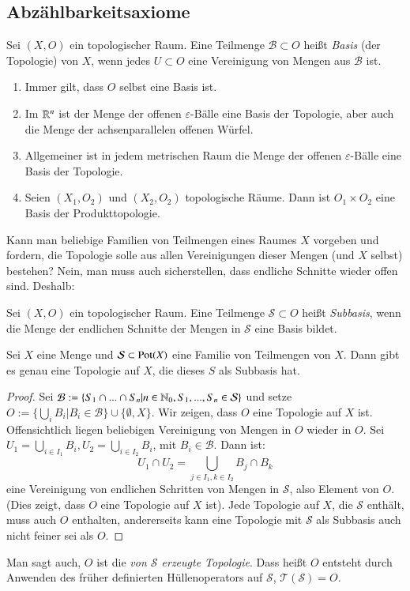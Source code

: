 \documentclass[a4paper,10pt]{scrartcl}
\newcommand{\eps}{\varepsilon}
\begin{document}
\subsection{Abzählbarkeitsaxiome}
\begin{df}
 Sei $(X,O)$ ein topologischer Raum. Eine Teilmenge $\mathcal B\subset O$ heißt \emph{Basis} (der Topologie) von $X$, wenn jedes $U\subset O$ eine Vereinigung von Mengen aus $\mathcal B$ ist.
\end{df}
\begin{exs*}
 \begin{enumerate}
  \item Immer gilt, dass $O$ selbst eine Basis ist.
  \item Im $\mathbb{R}^n$ ist der Menge der offenen $\eps$-Bälle eine Basis der Topologie, aber auch die Menge der achsenparallelen offenen Würfel.
  \item Allgemeiner ist in jedem metrischen Raum die Menge der offenen $\eps$-Bälle eine Basis der Topologie.
  \item Seien $(X_1,O_2)$ und $(X_2,O_2)$ topologische Räume. Dann ist $O_1\times O_2$ eine Basis der Produkttopologie.
\end{enumerate}
\end{exs*}
Kann man beliebige Familien von Teilmengen eines Raumes $X$ vorgeben und fordern, die Topologie solle aus allen Vereinigungen dieser Mengen (und $X$ selbst) bestehen? Nein, man muss auch sicherstellen, dass endliche Schnitte wieder offen sind. Deshalb:
\begin{df}
 Sei $(X,O)$ ein topologischer Raum. Eine Teilmenge $\mathcal S\subset O$ heißt \emph{Subbasis}, wenn die Menge der endlichen Schnitte der Mengen in $\mathcal S$ eine Basis bildet.
\end{df}
\begin{st}\label{thm:4.3}
 Sei $X$ eine Menge und $\mathcal S\subset \operatorname{Pot}(X)$  eine Familie von Teilmengen von $X$. Dann gibt es genau eine Topologie auf $X$, die dieses $S$ als Subbasis hat.
\end{st}
\begin{proof}
Sei $\mathcal B:=\{S_1\cap...\cap S_n|n\in \mathbb{N}_0, S_1,...,S_n\in \mathcal S\}$ und setze $O:=\{\bigcup_iB_i|B_i\in \mathcal B\} \cup\{\emptyset,X\}$.
 Wir zeigen, dass $O$ eine Topologie auf $X$ ist. Offensichtlich liegen beliebigen Vereinigung von Mengen in $O$ wieder in $O$. 
Sei $U_1=\bigcup_{i\in I_1}B_i, U_2=\bigcup_{i\in I_2}B_i$, mit $B_i\in \mathcal B$. Dann ist:
\[
 U_1\cap U_2=\bigcup\limits_{j\in I_1,k\in I_2}B_j\cap B_k
\]
eine Vereinigung von endlichen Schritten von Mengen in $\mathcal S$, also Element von $O$. (Dies zeigt, dass $O$ eine Topologie auf $X$ ist). 
Jede Topologie auf $X$, die $\mathcal S$ enthält, muss auch $O$ enthalten, andererseits kann eine Topologie mit $\mathcal S$ als Subbasis auch nicht feiner sei als $O$.
\end{proof}
Man sagt auch, $O$ ist die \emph{von $\mathcal S$ erzeugte Topologie}. Dass heißt $O$ entsteht durch Anwenden des früher definierten
Hüllenoperators auf $\mathcal S$, $\mathcal T(\mathcal S)=O$.
\end{document}
